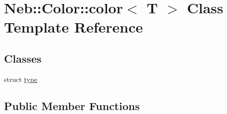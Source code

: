 \hypertarget{classNeb_1_1Color_1_1color}{\section{\-Neb\-:\-:\-Color\-:\-:color$<$ \-T $>$ \-Class \-Template \-Reference}
\label{classNeb_1_1Color_1_1color}
}
\subsection*{\-Classes}
\begin{DoxyCompactItemize}
\item 
struct \hyperlink{structNeb_1_1Color_1_1color_1_1type}{type}
\end{DoxyCompactItemize}
\subsection*{\-Public \-Member \-Functions}

